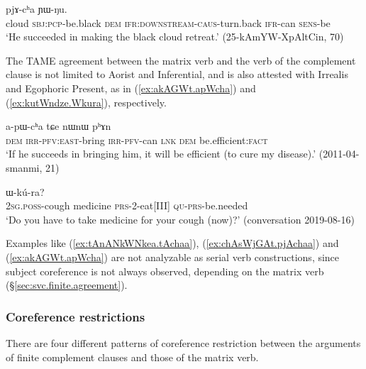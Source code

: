 \begin{exe}
\ex \label{ex:chAsWjGAt.pjAchaa}
  pjɤ-cʰa ɲɯ-ŋu. \\
 cloud \textsc{sbj}:\textsc{pcp}-be.black \textsc{dem} \textsc{ifr}:\textsc{downstream}-\textsc{caus}-turn.back \textsc{ifr}-can \textsc{sens}-be \\
 \glt `He succeeded in making the black cloud retreat.' (25-kAmYW-XpAltCin, 70)
 \end{exe}
 
The TAME agreement between the matrix verb and the verb of the complement clause is not limited to Aorist and Inferential, and is also attested with Irrealis and Egophoric Present, as in (\ref{ex:akAGWt.apWcha}) and (\ref{ex:kutWndze.Wkura}), respectively.

\begin{exe}
\ex \label{ex:akAGWt.apWcha}
  a-pɯ-cʰa tɕe nɯnɯ pʰɤn \\
 \textsc{dem} \textsc{irr}-\textsc{pfv}:\textsc{east}-bring \textsc{irr}-\textsc{pfv}-can \textsc{lnk} \textsc{dem} be.efficient:\textsc{fact} \\
 \glt `If he succeeds in bringing him, it will be efficient (to cure my disease).' (2011-04-smanmi, 21)
 \end{exe}
 
\begin{exe}
\ex \label{ex:kutWndze.Wkura}
  ɯ-kú-ra? \\
 \textsc{2sg}.\textsc{poss}-cough medicine \textsc{prs}-2-eat[III] \textsc{qu}-\textsc{prs}-be.needed \\
 \glt `Do you have to take medicine for your cough (now)?' (conversation 2019-08-16)
 \end{exe} 
 
 Examples like (\ref{ex:tAnANkWNkea.tAchaa}), (\ref{ex:chAsWjGAt.pjAchaa}) and (\ref{ex:akAGWt.apWcha}) are not analyzable as serial verb constructions, since subject coreference is not always observed, depending on the matrix verb (§\ref{sec:svc.finite.agreement}).
 
 \subsubsection{Coreference restrictions} \label{sec:finite.complement.coref}
There are four different patterns of coreference restriction between the arguments of finite complement clauses and those of the matrix verb.

